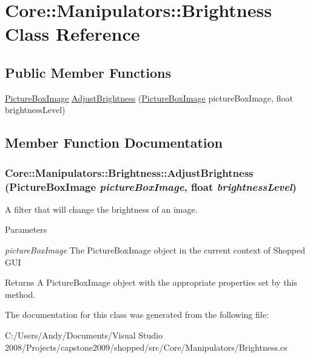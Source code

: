 \hypertarget{class_core_1_1_manipulators_1_1_brightness}{
\section{Core::Manipulators::Brightness Class Reference}
\label{class_core_1_1_manipulators_1_1_brightness}
}
\subsection*{Public Member Functions}
\begin{DoxyCompactItemize}
\item 
\hyperlink{class_core_1_1_images_1_1_picture_box_image}{PictureBoxImage} \hyperlink{class_core_1_1_manipulators_1_1_brightness_a1949faa9d47db583717627b1fdda80ce}{AdjustBrightness} (\hyperlink{class_core_1_1_images_1_1_picture_box_image}{PictureBoxImage} pictureBoxImage, float brightnessLevel)
\end{DoxyCompactItemize}


\subsection{Member Function Documentation}
\hypertarget{class_core_1_1_manipulators_1_1_brightness_a1949faa9d47db583717627b1fdda80ce}{
\subsubsection[{AdjustBrightness}]{ Core::Manipulators::Brightness::AdjustBrightness ({\bf PictureBoxImage} {\em pictureBoxImage}, \/  float {\em brightnessLevel})}}
\label{class_core_1_1_manipulators_1_1_brightness_a1949faa9d47db583717627b1fdda80ce}
A filter that will change the brightness of an image.


\begin{DoxyParams}{Parameters}
\item[{\em pictureBoxImage}]The PictureBoxImage object in the current context of Shopped GUI \end{DoxyParams}
\begin{DoxyReturn}{Returns}
A PictureBoxImage object with the appropriate properties set by this method. 
\end{DoxyReturn}


The documentation for this class was generated from the following file:\begin{DoxyCompactItemize}
\item 
C:/Users/Andy/Documents/Visual Studio 2008/Projects/capstone2009/shopped/src/Core/Manipulators/Brightness.cs\end{DoxyCompactItemize}
